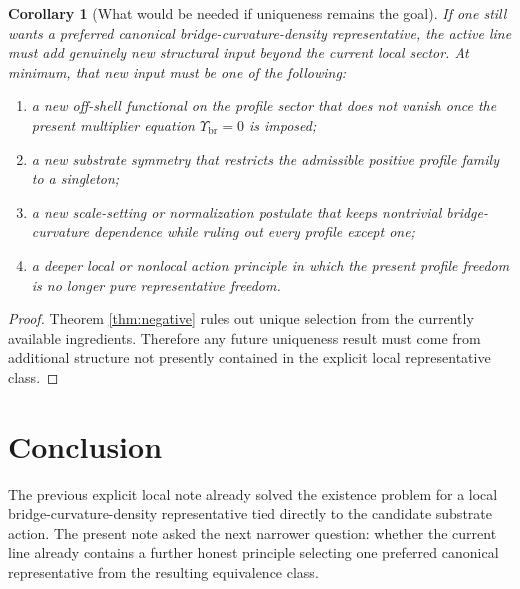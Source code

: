 \documentclass[11pt]{article}
\newcommand{\CurvSeedMult}{\Upsilon_{\mathrm{br}}}
\newtheorem{corollary}{Corollary}
\begin{document}
\begin{corollary}[What would be needed if uniqueness remains the goal]
\label{cor:newinput}
If one still wants a preferred canonical bridge-curvature-density representative, the active line must add genuinely new structural input beyond the current local sector. At minimum, that new input must be one of the following:
\begin{enumerate}
    \item a new off-shell functional on the profile sector that does not vanish once the present multiplier equation \(\CurvSeedMult=0\) is imposed;
    \item a new substrate symmetry that restricts the admissible positive profile family to a singleton;
    \item a new scale-setting or normalization postulate that keeps nontrivial bridge-curvature dependence while ruling out every profile except one;
    \item a deeper local or nonlocal action principle in which the present profile freedom is no longer pure representative freedom.
\end{enumerate}
\end{corollary}

\begin{proof}
Theorem \ref{thm:negative} rules out unique selection from the currently available ingredients. Therefore any future uniqueness result must come from additional structure not presently contained in the explicit local representative class.
\end{proof}

\section{Conclusion}

The previous explicit local note already solved the existence problem for a local bridge-curvature-density representative tied directly to the candidate substrate action. The present note asked the next narrower question: whether the current line already contains a further honest principle selecting one preferred canonical representative from the resulting equivalence class.
\end{document}
